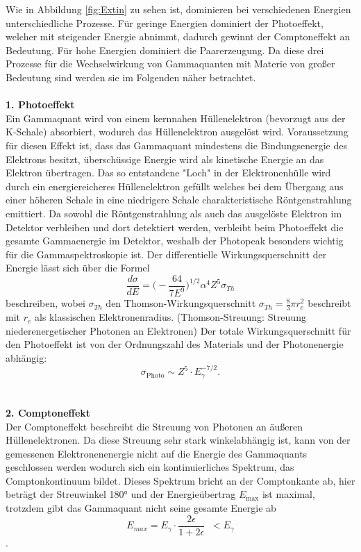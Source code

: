 Wie in Abbildung \ref{fig:Extin} zu sehen ist, dominieren bei verschiedenen Energien
unterschiedliche Prozesse. Für geringe Energien dominiert der Photoeffekt, welcher mit
steigender Energie abnimmt, dadurch gewinnt der Comptoneffekt an Bedeutung. Für hohe
Energien dominiert die Paarerzeugung.
Da diese drei Prozesse für die Wechselwirkung von Gammaquanten mit Materie von großer Bedeutung sind
werden sie im Folgenden näher betrachtet.
\cite{Springer3}
\\
\\
\textbf{1. Photoeffekt}\\
Ein Gammaquant wird von einem kernnahen Hüllenelektron (bevorzugt aus der K-Schale) absorbiert,
wodurch das Hüllenelektron ausgelöst wird. Voraussetzung für diesen Effekt ist, dass das Gammaquant
mindestens die Bindungsenergie des Elektrons besitzt, überschüssige Energie wird als kinetische
Energie an das Elektron übertragen.
Das so entstandene "Loch" in der Elektronenhülle wird durch ein energiereicheres Hüllenelektron
gefüllt welches bei dem Übergang aus einer höheren Schale in eine niedrigere Schale
charakteristische Röntgenstrahlung emittiert.
Da sowohl die Röntgenstrahlung als auch das ausgelöste Elektron im Detektor verbleiben und
dort detektiert werden, verbleibt beim Photoeffekt die gesamte Gammaenergie im Detektor, weshalb
der Photopeak besonders wichtig für die Gammaspektroskopie ist.
Der differentielle Wirkungsquerschnitt der Energie lässt sich über die Formel
\begin{equation}
  \frac{d \sigma}{d E} = \bigg(-\frac{64}{7E^{9}}\bigg)^{1/2}\alpha^4 Z^5\sigma_{Th}
  \label{eqn:diffPhoto}
\end{equation}
beschreiben, wobei $\sigma_{Th}$ den Thomson-Wirkungsquerschnitt $\sigma_{Th} = \frac{8}{3}\pi r_{e}^2$
beschreibt mit $r_e$ als klassischen Elektronenradius.
(Thomson-Streuung: Streuung niederenergetischer Photonen an Elektronen) \cite{Springer3}
Der totale Wirkungsquerschnitt für den Photoeffekt ist von der Ordnungszahl des Materials
und der Photonenergie abhängig:
\begin{equation}
  \sigma_{\text{Photo}}\sim Z^5\cdot E_{\gamma}^{-7/2}.
  \label{eqn:WQphoto}
\end{equation}
\cite{Karlsruhe}
\\
\\

\textbf{2. Comptoneffekt}\\
Der Comptoneffekt beschreibt die Streuung von Photonen an äußeren Hüllenelektronen. Da
diese Streuung sehr stark winkelabhängig ist, kann von der gemessenen Elektronenenergie
nicht auf die Energie des Gammaquants geschlossen werden wodurch sich ein kontinuierliches
Spektrum, das Comptonkontinuum bildet. Dieses Spektrum bricht an der Comptonkante ab, hier
beträgt der Streuwinkel 180° und der Energieübertrag $E_{\text{max}}$ ist maximal, trotzdem gibt das
Gammaquant nicht seine gesamte Energie ab
\begin{equation}
  E_{max}=E_{\gamma}\cdot\frac{2\epsilon}{1+2\epsilon}\;\;<E_{\gamma}
  \label{eqn:kante}
\end{equation}
\cite{Springer3}.

